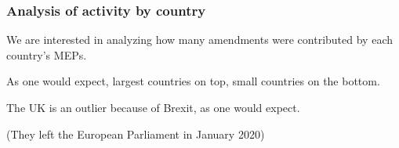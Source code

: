 \documentclass{beamer}
\begin{document}
\begin{frame}
	\frametitle{Analysis of activity by country}
	We are interested in analyzing how many amendments were contributed by each country's MEPs.
	
	\vspace{0.3cm}
	

	\vspace{0.3cm}

	\pause As one would expect, largest countries on top, small countries on the bottom.
	
	\pause The UK is an outlier because of Brexit, as one would expect.
	
	\pause (They left the European Parliament in January 2020)
	
\end{frame}
\end{document}
